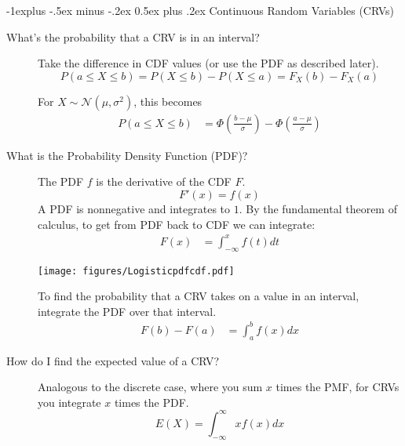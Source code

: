 \documentclass[10pt,landscape]{article}
\makeatletter
\newcommand{\N}{\mathcal{N}}
\renewcommand{\subsection}{\@startsection{subsection}{2}{0mm}%
                                {-1explus -.5ex minus -.2ex}%
                                {0.5ex plus .2ex}%
                                {\normalfont\normalsize\bfseries}}
\makeatother
\begin{document}
\begin{multicols*}{3}
\subsection{Continuous Random Variables (CRVs)}
\begin{description}
\item[What's the probability that a CRV is in an interval?] Take the difference in CDF values (or use the PDF as described later).
\[P(a \leq X \leq b) = P(X \leq b) - P(X \leq a) = F_X(b) - F_X(a)\]

For $X \sim \N(\mu,\sigma^2)$, this becomes
\begin{align*}
P(a\leq X\leq b)&=\Phi \left(\frac{b-\mu }{\sigma } \right) - \Phi \left( \frac{a-\mu }{\sigma } \right)
\end{align*}

\item[What is the Probability Density Function (PDF)?] The PDF $f$ is the derivative of the CDF $F$.
\[ F'(x) = f(x) \]
A PDF is nonnegative and integrates to $1$. By the fundamental theorem of calculus, to get from PDF back to CDF we can integrate:
\begin{align*} 
    F(x) &=  \int_{-\infty}^x f(t)dt  
   \end{align*}
   \begin{minipage}{\linewidth}
            \centering
\texttt{[image: figures/Logisticpdfcdf.pdf]}
        \end{minipage}
   To find the probability that a CRV takes on a value in an interval, integrate the PDF over that interval.
      \begin{align*} 
    F(b) - F(a)  &=  \int^b_a f(x)dx
       \end{align*}
   


\item[How do I find the expected value of a CRV?] Analogous to the discrete case, where you sum $x$ times the PMF, for CRVs you integrate $x$ times the PDF.
\[E(X) = \int^\infty_{-\infty}xf(x)dx \]
\end{description}



\end{multicols*}
\end{document}
